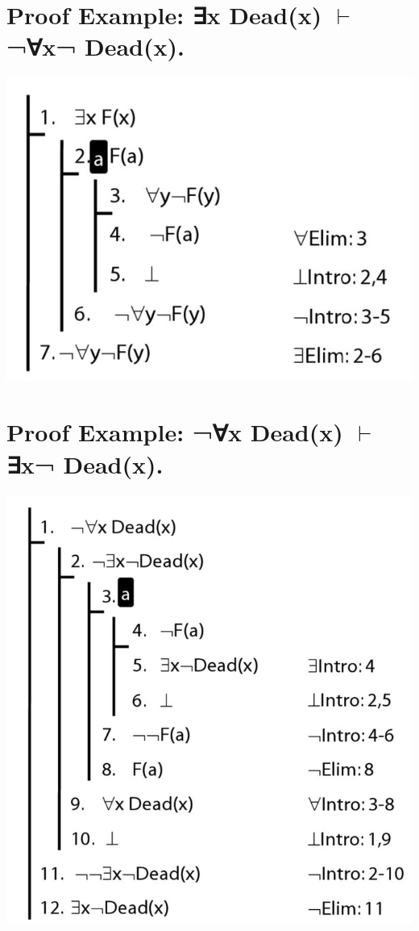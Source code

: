 \documentclass[12pt]{extarticle}
\begin{document}
\begin{multicols*}{3}
 
 
\section{Proof Example: ∃x Dead(x) $\vdash$ ¬∀x¬ Dead(x).}
 
\begin{center}
\includegraphics[scale=0.3]{img/unit_825_proof.png}
\end{center}
 
 
\section{Proof Example: ¬∀x Dead(x) $\vdash$ ∃x¬ Dead(x).}
 
\begin{center}
\includegraphics[scale=0.3]{img/unit_826_proof.png}
\end{center}
 

\end{multicols*}
\end{document}
